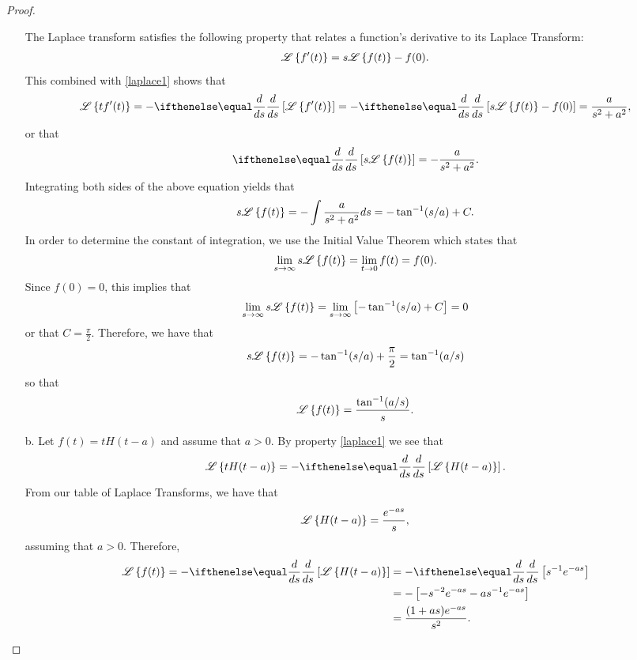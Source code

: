 \begin{proof}
\begin{enumerate}
      The Laplace transform satisfies the following property that relates a function's
      derivative to its Laplace Transform:
      \begin{align*}
        \mathscr{L}\left\{ {f'(t)} \right\} = s \mathscr{L}\left\{ {f(t)} \right\} - f(0).
      \end{align*}
      This combined with \eqref{laplace1} shows that
      \begin{align*}
        \laplace{tf'(t)} = -\der{s}{}\left[\laplace{f'(t)}\right] = -\der{s}{}\left[s\laplace{f(t)} - f(0)\right] = \frac{a}{s^2+a^2},
      \end{align*}
      or that
      \begin{align*}
        \der{s}{}\left[s \laplace{f(t)}\right] = -\frac{a}{s^2+a^2}.
      \end{align*}
      Integrating both sides of the above equation yields that
      \begin{align*}
        s\mathscr{L}\left\{ {f(t)} \right\} = -\int \frac{a}{s^2+a^2} ds = - \tan^{-1}(s/a) + C.
      \end{align*}
      In order to determine the constant of integration, we use the Initial Value Theorem which states
      that
      \begin{align*}
        \lim_{s\to\infty} s \mathscr{L}\left\{ {f(t)} \right\} = \lim_{t\to0} f(t) = f(0).
      \end{align*}
      Since $f(0) = 0$, this implies that
      \begin{align*}
        \lim_{s\to\infty} s \mathscr{L}\left\{ {f(t)} \right\} = \lim_{s\to\infty} \left[- \tan^{-1}(s/a) + C\right] = 0
      \end{align*}
      or that $C = \frac{\pi}{2}$. Therefore, we have that
      \begin{align*}
        s\mathscr{L}\left\{ {f(t)} \right\} = - \tan^{-1}(s/a) + \frac{\pi}{2} = \tan^{-1}(a/s)
      \end{align*}
      so that
      \begin{align*}
        \mathscr{L}\left\{ {f(t)} \right\} = \frac{\tan^{-1}(a/s)}{s}.
      \end{align*}

    \item[b.] Let $f(t) = t H(t-a)$ and assume that $a>0$. By property \eqref{laplace1}
      we see that
      \begin{align*}
        \laplace{t H(t-a)} = -\der{s}{}\left[\laplace{H(t-a)}\right].
      \end{align*}
      From our table of Laplace Transforms, we have that
      \begin{align*}
        \mathscr{L}\left\{ {H(t-a)} \right\} = \frac{e^{-a s}}{s},
      \end{align*}
      assuming that $a>0$. Therefore,
      \begin{align*}
        \laplace{f(t)} = - \der{s}{}\left[\laplace{H(t-a)}\right] &= - \der{s}{}\left[s^{-1}e^{-as}\right] \\
        &= -\left[-s^{-2}e^{-as} - as^{-1}e^{-as}\right] \\
        &= \frac{(1 + as)e^{-as}}{s^2}.
      \end{align*}
  \end{enumerate}
\end{proof}
\newpage
